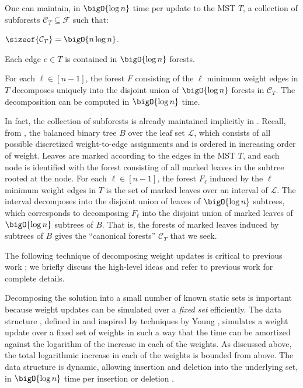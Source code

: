 \documentclass{toc}
\newcommand{\forests}{\mathcal{F}} %
\newcommand{\leaves}{\mathcal{L}} %
\newcommand{\subforests}[1][T]{\mathcal{C}_{#1}} %
\begin{document}
\begin{lemma}
   One can maintain, in
  $\bigO{\log n}$ time per update to the MST $T$, a collection of
  subforests $\subforests \subseteq \forests$ such that:
  \begin{mathresults}
  \item $\sizeof{\subforests} = \bigO{n \log n}$.
  \item Each edge $e \in T$ is contained in $\bigO{\log n}$ forests.
  \item For each $\ell \in [n-1]$, the forest $F$ consisting of the
    $\ell$ minimum weight edges in $T$ decomposes uniquely into the
    disjoint union of $\bigO{\log n}$ forests in $\subforests$. The
    decomposition can be computed in $\bigO{\log n}$ time.
  \end{mathresults}
\end{lemma}

In fact, the collection of subforests is already maintained implicitly
in . Recall, from , the
balanced binary tree $B$ over the leaf set $\leaves$, which consists
of all possible discretized weight-to-edge assignments and is ordered
in increasing order of weight. Leaves are marked according to the
edges in the MST $T$, and each node is identified with the forest
consisting of all marked leaves in the subtree rooted at the node. For
each $\ell \in [n-1]$, the forest $F_{\ell}$ induced by the $\ell$
minimum weight edges in $T$ is the set of marked leaves over an
interval of $\leaves$. The interval decomposes into the disjoint union
of leaves of $\bigO{\log n}$ subtrees, which corresponds to
decomposing $F_{\ell}$ into the disjoint union of marked leaves of
$\bigO{\log n}$ subtrees of $B$. That is, the forests of marked leaves
induced by subtrees of $B$ gives the ``canonical forests''
$\subforests$ that we seek.

The following technique of decomposing weight updates is critical to
previous work \cite{cq-17-soda,cq-17-focs,cq-19}; we briefly
discuss the high-level ideas and refer to previous work for complete
details.

Decomposing the solution into a small number of known static sets is
important because weight updates can be simulated over a \emph{fixed
  set} efficiently. The data structure , defined in
\cite{cq-17-soda} and inspired by techniques by Young
\cite{young-14}, simulates a weight update over a fixed set of weights
in such a way that the time can be amortized against the logarithm of
the increase in each of the weights. As discussed above, the total
logarithmic increase in each of the weights is bounded from above. The
data structure  is dynamic, allowing insertion and
deletion into the underlying set, in $\bigO{\log n}$ time per
insertion or deletion \cite{cq-17-focs}.
\end{document}
